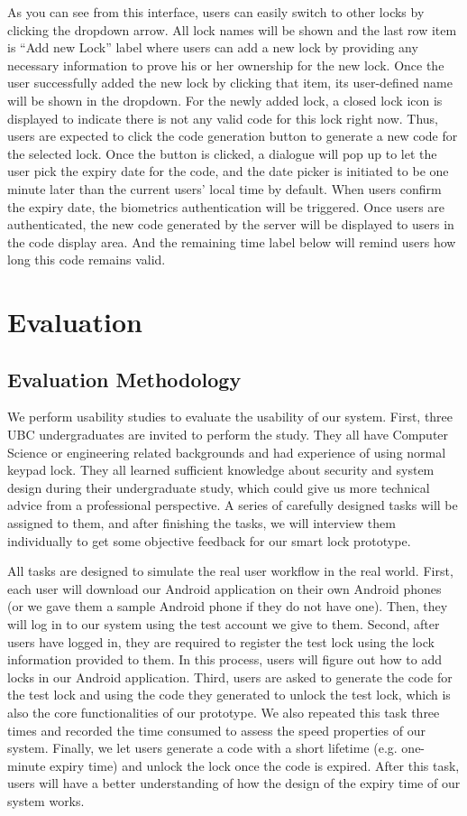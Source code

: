 \documentclass[conference]{IEEEtran}
\begin{document}
As you can see from this interface, users can easily switch to other locks by clicking the dropdown arrow. All lock names will be shown and the last row item is “Add new Lock” label where users can add a new lock by providing any necessary information to prove his or her ownership for the new lock. Once the user successfully added the new lock by clicking that item, its user-defined name will be shown in the dropdown. For the newly added lock, a closed lock icon is displayed to indicate there is not any valid code for this lock right now. Thus, users are expected to click the code generation button to generate a new code for the selected lock. Once the button is clicked, a dialogue will pop up to let the user pick the expiry date for the code, and the date picker is initiated to be one minute later than the current users’ local time by default. When users confirm the expiry date, the biometrics authentication will be triggered. Once users are authenticated, the new code generated by the server will be displayed to users in the code display area. And the remaining time label below will remind users how long this code remains valid. 




\section{Evaluation}
\subsection{Evaluation Methodology}
We perform usability studies to evaluate the usability of our system. First, three UBC undergraduates are invited to perform the study. They all have Computer Science or engineering related backgrounds and had experience of using normal keypad lock. They all learned sufficient knowledge about security and system design during their undergraduate study, which could give us more technical advice from a professional perspective.  A series of carefully designed tasks will be assigned to them, and after finishing the tasks, we will interview them individually to get some objective feedback for our smart lock prototype.

All tasks are designed to simulate the real user workflow in the real world. First, each user will download our Android application on their own Android phones (or we gave them a sample Android phone if they do not have one). Then, they will log in to our system using the test account we give to them. Second, after users have logged in, they are required to register the test lock using the lock information provided to them. In this process, users will figure out how to add locks in our Android application. Third, users are asked to generate the code for the test lock and using the code they generated to unlock the test lock, which is also the core functionalities of our prototype. We also repeated this task three times and recorded the time consumed to assess the speed properties of our system.  Finally, we let users generate a code with a short lifetime (e.g. one-minute expiry time) and unlock the lock once the code is expired. After this task, users will have a better understanding of how the design of the expiry time of our system works.
\end{document}
